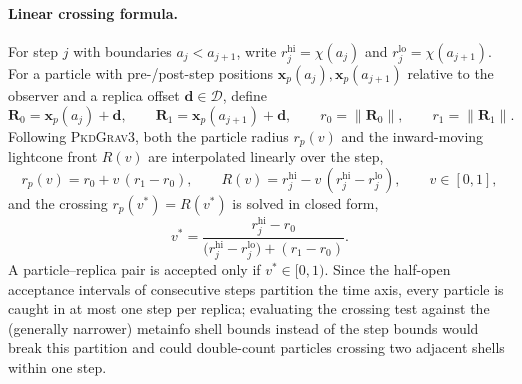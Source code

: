 \documentclass{report}
\begin{document}
\paragraph{Linear crossing formula.} For step $j$ with boundaries $a_j < a_{j+1}$, write $r_j^{\mathrm{hi}} = \chi(a_j)$ and $r_j^{\mathrm{lo}} = \chi(a_{j+1})$. For a particle with pre-/post-step positions $\mathbf{x}_p(a_j), \mathbf{x}_p(a_{j+1})$ relative to the observer and a replica offset $\mathbf{d}\in\mathcal{D}$, define
\begin{equation}
  \mathbf{R}_0 = \mathbf{x}_p(a_j) + \mathbf{d}, \qquad \mathbf{R}_1 = \mathbf{x}_p(a_{j+1}) + \mathbf{d}, \qquad
  r_0 = \lVert \mathbf{R}_0 \rVert, \qquad r_1 = \lVert \mathbf{R}_1 \rVert.
  \label{eq:replica_radii}
\end{equation}
Following \textsc{PkdGrav3}, both the particle radius $r_p(v)$ and the inward-moving lightcone front $R(v)$ are interpolated linearly over the step,
\begin{equation}
  r_p(v) = r_0 + v\,(r_1 - r_0), \qquad R(v) = r_j^{\mathrm{hi}} - v\,(r_j^{\mathrm{hi}} - r_j^{\mathrm{lo}}), \qquad v\in[0,1],
  \label{eq:scalar_interp}
\end{equation}
and the crossing $r_p(v^\ast) = R(v^\ast)$ is solved in closed form,
\begin{equation}
  v^\ast = \frac{r_j^{\mathrm{hi}} - r_0}{\big(r_j^{\mathrm{hi}} - r_j^{\mathrm{lo}}\big) + (r_1 - r_0)}.
  \label{eq:vx_formula}
\end{equation}
A particle--replica pair is accepted only if $v^\ast \in [0,1)$. Since the half-open acceptance intervals of consecutive steps partition the time axis, every particle is caught in at most one step per replica; evaluating the crossing test against the (generally narrower) metainfo shell bounds instead of the step bounds would break this partition and could double-count particles crossing two adjacent shells within one step.
\end{document}

